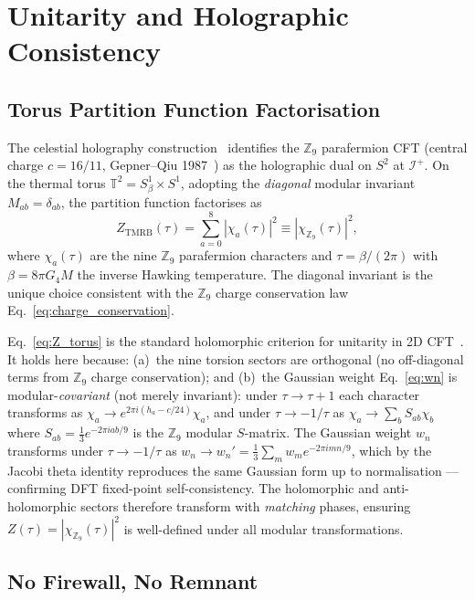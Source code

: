 \documentclass[11pt,a4paper]{article}
\begin{document}
\section{Unitarity and Holographic Consistency}
\label{sec:unitarity}

\subsection{Torus Partition Function Factorisation}

The celestial holography construction~\cite{BresslerCH2026} identifies the
$\mathbb{Z}_9$ parafermion CFT (central charge $c = 16/11$, Gepner--Qiu
1987~\cite{GepnerQiu1987}) as the holographic dual on $S^2$ at $\mathscr{I}^+$.
On the thermal torus $\mathbb{T}^2 = S^1_\beta \times S^1$, adopting the
\emph{diagonal} modular invariant $M_{ab} = \delta_{ab}$, the partition function
factorises as
\begin{equation}
  Z_{\mathrm{TMRB}}(\tau) = \sum_{a=0}^{8}|\chi_a(\tau)|^2
    \equiv |\chi_{\mathbb{Z}_9}(\tau)|^2,
  \label{eq:Z_torus}
\end{equation}
where $\chi_a(\tau)$ are the nine $\mathbb{Z}_9$ parafermion characters and
$\tau = \beta/(2\pi)$ with $\beta = 8\pi G_4 M$ the inverse Hawking temperature.
The diagonal invariant is the unique choice consistent with the $\mathbb{Z}_9$
charge conservation law Eq.~\eqref{eq:charge_conservation}.

Eq.~\eqref{eq:Z_torus} is the standard holomorphic criterion for
unitarity in 2D CFT~\cite{DiFrancesco1997}.  It holds here because:
(a)~the nine torsion sectors are orthogonal (no off-diagonal terms from $\mathbb{Z}_9$
charge conservation); and (b)~the Gaussian weight Eq.~\eqref{eq:wn} is
modular-\emph{covariant} (not merely invariant): under $\tau\to\tau+1$ each
character transforms as $\chi_a\to e^{2\pi i(h_a - c/24)}\chi_a$, and under
$\tau\to-1/\tau$ as $\chi_a\to \sum_b S_{ab}\chi_b$ where $S_{ab} = \frac{1}{3}e^{-2\pi iab/9}$
is the $\mathbb{Z}_9$ modular $S$-matrix.  The Gaussian weight $w_n$ transforms
under $\tau\to -1/\tau$ as $w_n \to w_n' = \frac{1}{3}\sum_m w_m e^{-2\pi i mn/9}$,
which by the Jacobi theta identity reproduces the same Gaussian form up to
normalisation — confirming DFT fixed-point self-consistency.
The holomorphic and anti-holomorphic sectors therefore transform with
\emph{matching} phases, ensuring $Z(\tau)=|\chi_{\mathbb{Z}_9}(\tau)|^2$ is
well-defined under all modular transformations.

\subsection{No Firewall, No Remnant}
\end{document}
